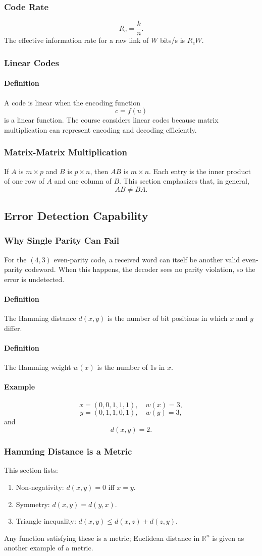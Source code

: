 \documentclass[12pt]{article}
\newcommand{\Definition}{\paragraph{Definition}}
\newcommand{\Example}{\paragraph{Example}}
\begin{document}
\subsubsection{Code Rate}
\[
R_c=\frac{k}{n}.
\]
The effective information rate for a raw link of $W$ bits/s is $R_cW$.

\subsubsection{Linear Codes}
\Definition A code is linear when the encoding function
\[
c=f(u)
\]
is a linear function. The course considers linear codes because matrix multiplication can represent encoding and decoding efficiently.

\subsubsection{Matrix-Matrix Multiplication}
If $A$ is $m\times p$ and $B$ is $p\times n$, then $AB$ is $m\times n$. Each entry is the inner product of one row of $A$ and one column of $B$. This section emphasizes that, in general,
\[
AB\ne BA.
\]

\subsection{Error Detection Capability}
\subsubsection{Why Single Parity Can Fail}
For the $(4,3)$ even-parity code, a received word can itself be another valid even-parity codeword. When this happens, the decoder sees no parity violation, so the error is undetected.

\Definition The Hamming distance $d(x,y)$ is the number of bit positions in which $x$ and $y$ differ.

\Definition The Hamming weight $w(x)$ is the number of 1s in $x$.

\Example
\[
x=(0,0,1,1,1),\quad w(x)=3,
\]
\[
y=(0,1,1,0,1),\quad w(y)=3,
\]
and
\[
d(x,y)=2.
\]

\subsubsection{Hamming Distance is a Metric}
This section lists:
\begin{enumerate}
    \item Non-negativity: $d(x,y)=0$ iff $x=y$.
    \item Symmetry: $d(x,y)=d(y,x)$.
    \item Triangle inequality: $d(x,y)\le d(x,z)+d(z,y)$.
\end{enumerate}
Any function satisfying these is a metric; Euclidean distance in $\mathbb R^n$ is given as another example of a metric.
\end{document}

